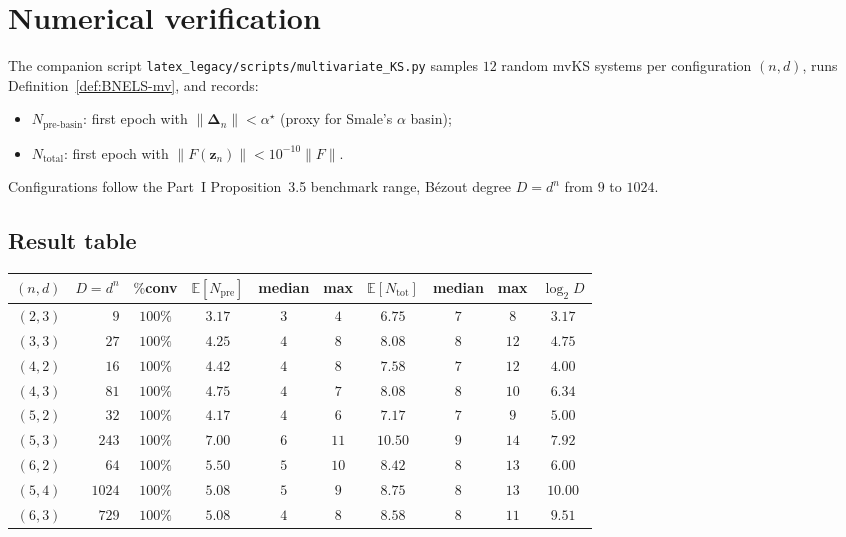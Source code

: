 \documentclass[11pt,a4paper]{article}
\begin{document}
\section{Numerical verification}\label{sec:numerics}

The companion script \verb|latex_legacy/scripts/multivariate_KS.py| samples $12$ random mvKS systems per configuration $(n, d)$, runs Definition~\ref{def:BNELS-mv}, and records:
\begin{itemize}
\item $N_{\text{pre-basin}}$: first epoch with $\|\boldsymbol{\Delta}_n\| < \alpha^\star$ (proxy for Smale's $\alpha$ basin);
\item $N_{\text{total}}$: first epoch with $\|F(\mathbf z_n)\| < 10^{-10}\|F\|$.
\end{itemize}
Configurations follow the Part~I Proposition~3.5 benchmark range, B\'ezout degree $D = d^n$ from $9$ to $1024$.

\subsection{Result table}

\begin{center}
\begin{tabular}{rrcccccccc}
\toprule
$(n, d)$ & $D = d^n$ & $\%$conv & $\mathbb{E}[N_{\text{pre}}]$ & median & max & $\mathbb{E}[N_{\text{tot}}]$ & median & max & $\log_2 D$ \\
\midrule
$(2, 3)$ & $9$    & $100\%$ & $3.17$ & $3$ & $4$  & $6.75$  & $7$ & $8$  & $3.17$ \\
$(3, 3)$ & $27$   & $100\%$ & $4.25$ & $4$ & $8$  & $8.08$  & $8$ & $12$ & $4.75$ \\
$(4, 2)$ & $16$   & $100\%$ & $4.42$ & $4$ & $8$  & $7.58$  & $7$ & $12$ & $4.00$ \\
$(4, 3)$ & $81$   & $100\%$ & $4.75$ & $4$ & $7$  & $8.08$  & $8$ & $10$ & $6.34$ \\
$(5, 2)$ & $32$   & $100\%$ & $4.17$ & $4$ & $6$  & $7.17$  & $7$ & $9$  & $5.00$ \\
$(5, 3)$ & $243$  & $100\%$ & $7.00$ & $6$ & $11$ & $10.50$ & $9$ & $14$ & $7.92$ \\
$(6, 2)$ & $64$   & $100\%$ & $5.50$ & $5$ & $10$ & $8.42$  & $8$ & $13$ & $6.00$ \\
$(5, 4)$ & $1024$ & $100\%$ & $5.08$ & $5$ & $9$  & $8.75$  & $8$ & $13$ & $10.00$ \\
$(6, 3)$ & $729$  & $100\%$ & $5.08$ & $4$ & $8$  & $8.58$  & $8$ & $11$ & $9.51$ \\
\bottomrule
\end{tabular}
\end{center}
\end{document}
